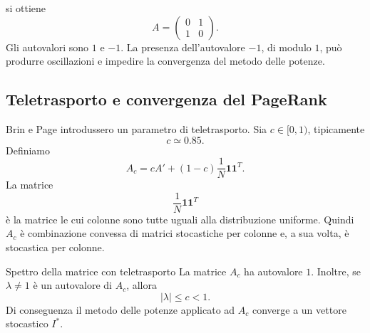 \documentclass[a4paper]{article}
\begin{document}
si ottiene
\[
    A=
    \begin{pmatrix}
        0&1\\
        1&0
    \end{pmatrix}.
\]
Gli autovalori sono \(1\) e \(-1\). La presenza dell'autovalore \(-1\), di modulo \(1\), può produrre oscillazioni e impedire la convergenza del metodo delle potenze.

\subsection{Teletrasporto e convergenza del PageRank}

Brin e Page introdussero un parametro di teletrasporto. Sia \(c\in[0,1)\), tipicamente
\[
    c\simeq 0.85.
\]
Definiamo
\[
    A_c=cA'+(1-c)\frac1N\mathbf 1\mathbf 1^T.
\]
La matrice
\[
    \frac1N\mathbf 1\mathbf 1^T
\]
è la matrice le cui colonne sono tutte uguali alla distribuzione uniforme. Quindi \(A_c\) è combinazione convessa di matrici stocastiche per colonne e, a sua volta, è stocastica per colonne.

\begin{snippettheorem}{Spettro della matrice con teletrasporto}
    La matrice \(A_c\) ha autovalore \(1\). Inoltre, se \(\lambda\neq 1\) è un autovalore di \(A_c\), allora
    \[
        |\lambda|\leq c<1.
    \]
    Di conseguenza il metodo delle potenze applicato ad \(A_c\) converge a un vettore stocastico \(I^*\).
\end{snippettheorem}
\end{document}

